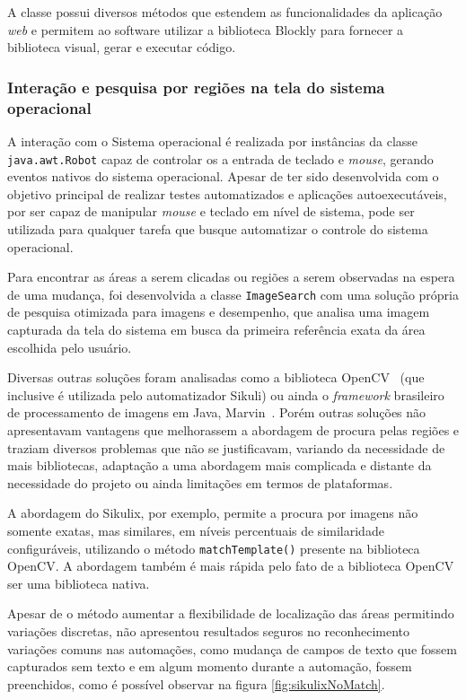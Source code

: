 \documentclass[tg]{mdtufsm}
\begin{document}
                    A classe possui diversos métodos que estendem as funcionalidades da aplicação \emph{web} e permitem ao software utilizar a biblioteca Blockly para fornecer a biblioteca visual, gerar e executar código.

                \subsubsection {Interação e pesquisa por regiões na tela do sistema operacional}

                    A interação com o Sistema operacional é realizada por instâncias da classe \texttt{java.awt.Robot} capaz de controlar os a entrada de teclado e \emph{mouse}, gerando eventos nativos do sistema operacional. Apesar de ter sido desenvolvida com o objetivo principal de realizar testes automatizados e aplicações autoexecutáveis, por ser capaz de manipular \emph{mouse} e teclado em nível de sistema, pode ser utilizada para qualquer tarefa que busque automatizar o controle do sistema operacional.

                    Para encontrar as áreas a serem clicadas ou regiões a serem observadas na espera de uma mudança, foi desenvolvida a classe \texttt{ImageSearch} com uma solução própria de pesquisa otimizada para imagens e desempenho, que analisa uma imagem capturada da tela do sistema em busca da primeira referência exata da área escolhida pelo usuário.

                    Diversas outras soluções foram analisadas como a biblioteca OpenCV~\cite{openCV} (que inclusive é utilizada pelo automatizador Sikuli) ou ainda o \emph{framework} brasileiro de processamento de imagens em Java, Marvin~\cite{marvin}. Porém outras soluções não apresentavam vantagens que melhorassem a abordagem de procura pelas regiões e traziam diversos problemas que não se justificavam, variando da necessidade de mais bibliotecas, adaptação a uma abordagem mais complicada e distante da necessidade do projeto ou ainda limitações em termos de plataformas.

                    A abordagem do Sikulix, por exemplo, permite a procura por imagens não somente exatas, mas similares, em níveis percentuais de similaridade configuráveis, utilizando o método \texttt{matchTemplate()} presente na biblioteca OpenCV. A abordagem também é mais rápida pelo fato de a biblioteca OpenCV ser uma biblioteca nativa.

                    Apesar de o método aumentar a flexibilidade de localização das áreas permitindo variações discretas, não apresentou resultados seguros no reconhecimento variações comuns nas automações, como mudança de campos de texto que fossem capturados sem texto e em algum momento durante a automação, fossem preenchidos, como é possível observar na figura \ref{fig:sikulixNoMatch}.
\end{document}
